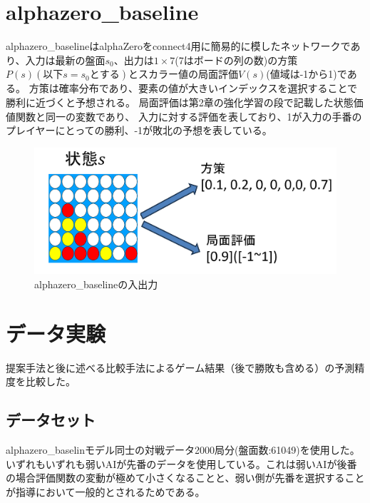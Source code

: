 \section{alphazero\_baseline}
alphazero\_baseline\cite{baseline}はalphaZeroをconnect4用に簡易的に模したネットワークであり、入力は最新の盤面$s_0$、出力は$1\times7$(7はボードの列の数)の方策$P(s)(以下s=s_0とする)$とスカラー値の局面評価$V(s)$(値域は-1から1)である。
方策は確率分布であり、要素の値が大きいインデックスを選択することで勝利に近づくと予想される。
局面評価は第2章の強化学習の段で記載した状態価値関数と同一の変数であり、
入力に対する評価を表しており、1が入力の手番のプレイヤーにとっての勝利、-1が敗北の予想を表している。

\begin{figure}[t]
    \centering
    \includegraphics[trim={0cm 0cm 0cm 0cm},clip]{./figure/baseline.png}

    \caption{alphazero\_baselineの入出力}
    \label{fig:baseline}
\end{figure}


\section{データ実験}
\label{chap:evaluation}
提案手法と後に述べる比較手法によるゲーム結果（後で勝敗も含める）の予測精度を比較した。
\subsection{データセット}
alphazero\_baselinモデル同士の対戦データ2000局分(盤面数:61049)を使用した。いずれもいずれも弱いAIが先番のデータを使用している。これは弱いAIが後番の場合評価関数の変動が極めて小さくなることと、弱い側が先番を選択することが指導において一般的とされるためである。

